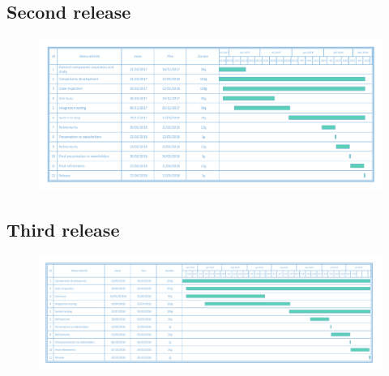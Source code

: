 \documentclass[english]{article}
\begin{document}
		\begin{landscape}
	\subsection{Second release}
		\begin{figure}[H]
			\centering
			\includegraphics[scale=0.725]{./Images/6-SecondRelease18.pdf} 
		\end{figure}
		\end{landscape}
		\begin{landscape}
	\subsection{Third release}
		\begin{figure}[H]
			\centering
			\includegraphics[scale=0.55]{./Images/7-ThirdRelease18.pdf} 
		\end{figure}
		\end{landscape}
\end{document}
